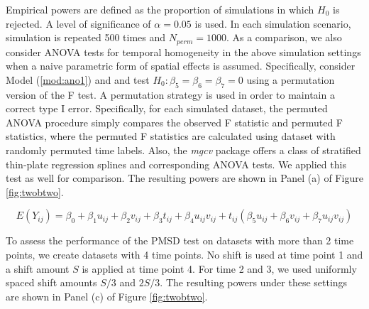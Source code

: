 	Empirical powers are defined as the proportion of simulations in which $H_0$ is rejected. A level of significance of $\alpha=0.05$ is used. In each simulation scenario, simulation is repeated 500 times and $N_{perm}=1000$. As a comparison, we also consider ANOVA tests for temporal homogeneity in the above simulation settings when a naive parametric form of spatial effects is assumed. Specifically, consider Model (\ref{mod:ano1}) and and test $H_0: \beta_5=\beta_6=\beta_7=0$ using a permutation version of the F test. A permutation strategy is used in order to maintain a correct type I error. Specifically, for each simulated dataset, the permuted ANOVA procedure simply compares the observed F statistic and permuted F statistics, where the permuted F statistics are calculated using dataset with randomly permuted time labels. Also, the \emph{mgcv} package offers a class of stratified thin-plate regression splines and corresponding ANOVA tests. We applied this test as well for comparison. The resulting powers are shown in Panel (a) of Figure \ref{fig:twobtwo}.
	
	\begin{equation} \label{mod:ano1}
	E(Y_{ij}) =\beta_0+\beta_1u_{ij}+ \beta_2v_{ij}+\beta_3 t_{ij} + \beta_4 u_{ij} v_{ij} + t_{ij}(\beta_5u_{ij}+ \beta_6v_{ij}+\beta_7  u_{ij} v_{ij}) 
	\end{equation}
	
	To assess the performance of the PMSD test on datasets with more than 2 time points, we create datasets with 4 time points. No shift is used at time point 1 and a shift amount $S$ is applied at time point 4. For time 2 and 3, we used uniformly spaced shift amounts $S/3$ and $2S/3$. The resulting powers under these settings are shown in Panel (c) of Figure \ref{fig:twobtwo}. 
	
